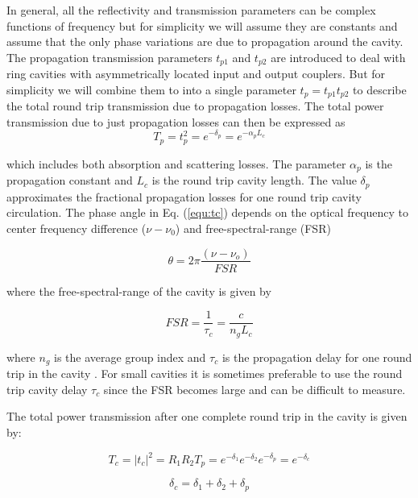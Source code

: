 \documentclass[10pt]{article}
\begin{document}
\noindent In general, all the reflectivity and transmission parameters can be complex functions of frequency but for  simplicity we will assume they are constants and assume that the only phase variations are due to propagation around the cavity. The propagation transmission parameters $t_{p1}$ and $t_{p2}$ are introduced to deal with ring cavities with asymmetrically located input and output couplers. But for simplicity we will combine them to into a single parameter $t_p = t_{p1} t_{p2}$ to describe the total round trip transmission due to  propagation losses.  The total power transmission due to just propagation losses can then be expressed as
\begin{equation}
T_p = t_p^2 = e^{-\delta_{p}}= e^{-\alpha_p L_c}  
\end{equation}

\noindent which includes both absorption and scattering losses. The parameter $\alpha_p$  is the propagation constant and $L_c$ is the round trip cavity length.    The value $\delta_{p}$  approximates the fractional propagation losses for one round trip cavity circulation.  The phase angle in Eq. (\ref{equ:tc}) depends on the optical frequency  to center frequency difference ($ \nu - \nu_0 $) and  free-spectral-range (FSR)

\begin{equation} 
\theta = 2\pi \frac{ (\nu - \nu_o)}{FSR}  
\end{equation}  

\noindent where the free-spectral-range of the cavity is given by

\begin{equation} 
FSR = \frac{1}{\tau_c}  = \frac{c}{n_g L_c}
\end{equation}  

\noindent   where  $n_g$ is the average group index and $\tau_c$ is the propagation delay for one round trip in the cavity \cite{Shi:07}. For small cavities it is sometimes preferable to use the round trip cavity delay $\tau_c$ since the FSR becomes large and can be difficult to measure. 

The total power transmission after one complete round trip in the cavity is given by:

\begin{equation}
  T_c = |t_c|^2 = R_1 R_2 T_p  = e^{-\delta_1} e^{-\delta_2} e^{-\delta_p} = e^{-\delta_c}
\end{equation}



\begin{equation} 
  \delta_c = \delta_1 + \delta_2 + \delta_p 
\end{equation} 
\end{document}
